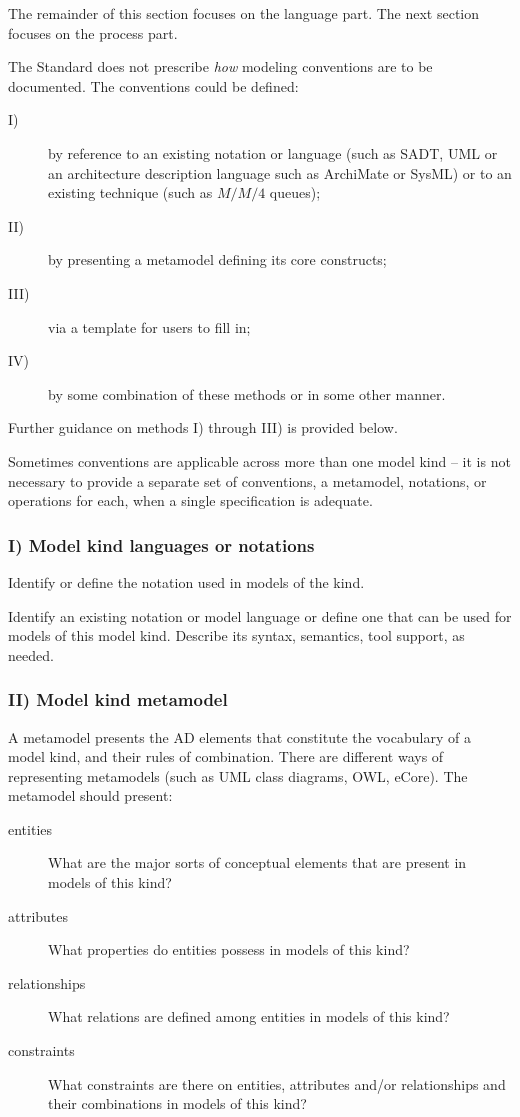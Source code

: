 The remainder of this section focuses on the language part. The next
section focuses on the process part.

The Standard does not prescribe \emph{how} modeling conventions are to
be documented.  The conventions could be defined:
\begin{description}
\item[I)] by reference to an existing notation or language (such as
  SADT, UML or an architecture description language such as ArchiMate
  or SysML) or to an existing technique (such as $M/M/4$ queues);
\item[II)] by presenting a metamodel defining its core constructs;
\item[III)] via a template for users to fill in;
\item[IV)] by some combination of these methods or in some other
  manner.
\end{description}

Further guidance on methods I) through III) is provided below.
 
Sometimes conventions are applicable across more than one model kind
-- it is not necessary to provide a separate set of conventions, a
metamodel, notations, or operations for each, when a single
specification is adequate.


\subsubsection*{I) Model kind languages or notations \Optional}

Identify or define the notation used in models of the kind.

Identify an existing notation or model language or define one that can
be used for models of this model kind. Describe its syntax, semantics,
tool support, as needed.


\subsubsection*{II) Model kind metamodel \Optional} 

A metamodel presents the AD elements that constitute the
vocabulary of a model kind, and their rules of combination. There are
different ways of representing metamodels (such as UML class diagrams, OWL,
eCore). The metamodel should present:
\begin{description}
\item[entities] What are the major sorts of conceptual elements that
  are present in models of this kind?
\item[attributes] What properties do entities possess in models of
  this kind?
\item[relationships] What relations are defined among entities in
  models of this kind?
\item[constraints] What constraints are there on entities, attributes
  and/or relationships and their combinations in models of this kind?
\end{description}

